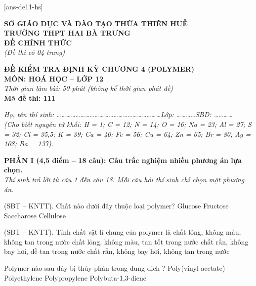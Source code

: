 \documentclass[11pt,a4paper]{article}
\def\loigiai#1{}
\begin{document}
[ans-de11-hs]

\noindent
\begin{minipage}[t]{0.48\textwidth}
	\centering
	\textbf{SỞ GIÁO DỤC VÀ ĐÀO TẠO THỪA THIÊN HUẾ}\\
	\textbf{TRƯỜNG THPT HAI BÀ TRƯNG}\\
	\textbf{ĐỀ CHÍNH THỨC}\\
	\textit{(Đề thi có 04 trang)}
\end{minipage}\hfill
\begin{minipage}[t]{0.48\textwidth}
	\centering
	\textbf{\color{mainGreen}ĐỀ KIỂM TRA ĐỊNH KỲ CHƯƠNG 4 (POLYMER)}\\
	\textbf{MÔN: HOÁ HỌC -- LỚP 12}\\
	\textit{Thời gian làm bài: 50 phút (không kể thời gian phát đề)}\\
	\textbf{Mã đề thi: 111}
\end{minipage}


\vspace{0.1cm}
\noindent\textit{Họ, tên thí sinh: \dots\dots\dots\dots\dots\dots\dots\dots\dots\dots\dots\dots\dots\dots\dots\dots\dots\dots\dots\dots\dots\dots Lớp: \dots\dots\dots\dots SBD: \dots\dots\dots\dots}\\
\noindent\textit{(Cho biết nguyên tử khối: H = 1; C = 12; N = 14; O = 16; Na = 23; Al = 27; S = 32; Cl = 35,5; K = 39; Ca = 40; Fe = 56; Cu = 64; Zn = 65; Br = 80; Ag = 108; Ba = 137).}

\vspace{0.15cm}
\noindent
\textbf{PHẦN I (4,5 điểm -- 18 câu): Câu trắc nghiệm nhiều phương án lựa chọn.}\\
\textit{Thí sinh trả lời từ câu 1 đến câu 18. Mỗi câu hỏi thí sinh chỉ chọn một phương án.}

\setcounter{ex}{0}

\begin{ex}
(SBT -- KNTT). Chất nào dưới đây thuộc loại polymer?
\choice
{Glucose}
{Fructose}
{Saccharose}
{Cellulose}
\loigiai{}
\end{ex}

\begin{ex}
(SBT -- KNTT). Tính chất vật lí chung của polymer là
\choice
{chất lỏng, không màu, không tan trong nước}
{chất lỏng, không màu, tan tốt trong nước}
{chất rắn, không bay hơi, dễ tan trong nước}
{chất rắn, không bay hơi, không tan trong nước}
\loigiai{}
\end{ex}

\begin{ex}
Polymer nào sau đây bị thủy phân trong dung dịch ?
\choice
{Poly(vinyl acetate)}
{Polyethylene}
{Polypropylene}
{Polybuta-1,3-diene}
\loigiai{}
\end{ex}
\end{document}
